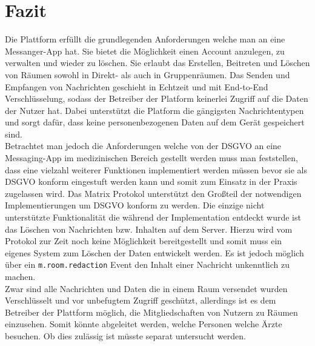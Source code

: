    \chapter{Fazit}\label{ch:fazit}
    Die Plattform erfüllt die grundlegenden Anforderungen welche man an eine Messanger-App hat.
    Sie bietet die Möglichkeit einen Account anzulegen, zu verwalten und wieder zu löschen.
    Sie erlaubt das Erstellen, Beitreten und Löschen von Räumen sowohl in Direkt- als auch in Gruppenräumen.
    Das Senden und Empfangen von Nachrichten geschieht in Echtzeit und mit End-to-End Verschlüsselung, sodass der Betreiber der Platform keinerlei Zugriff auf die Daten der Nutzer hat.
    Dabei unterstützt die Platform die gängigsten Nachrichtentypen und sorgt dafür, dass keine personenbezogenen Daten auf dem Gerät gespeichert sind.\\
    Betrachtet man jedoch die Anforderungen welche von der DSGVO an eine Messaging-App im medizinischen Bereich gestellt werden muss man feststellen, dass eine vielzahl weiterer Funktionen implementiert werden müssen bevor sie als DSGVO konform eingestuft werden kann und somit zum Einsatz in der Praxis zugelassen wird.
    Das Matrix Protokol unterstützt den Großteil der notwendigen Implementierungen um DSGVO konform zu werden.
    Die einzige nicht unterstützte Funktionalität die während der Implementation entdeckt wurde ist das Löschen von Nachrichten bzw. Inhalten auf dem Server.
    Hierzu wird vom Protokol zur Zeit noch keine Möglichkeit bereitgestellt und somit muss ein eigenes System zum Löschen der Daten entwickelt werden.
    Es ist jedoch möglich über ein \texttt{m.room.redaction} Event den Inhalt einer Nachricht unkenntlich zu machen.\\
    Zwar sind alle Nachrichten und Daten die in einem Raum versendet wurden Verschlüsselt und vor unbefugtem Zugriff geschützt, allerdings ist es dem Betreiber der Plattform möglich, die Mitgliedschaften von Nutzern zu Räumen einzusehen.
    Somit könnte abgeleitet werden, welche Personen welche Ärzte besuchen.
    Ob dies zulässig ist müsste separat untersucht werden.


